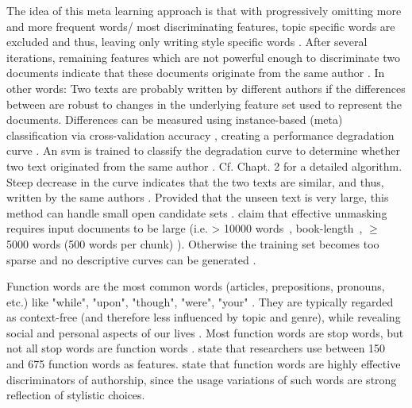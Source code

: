\begin{definition}
    [Unmasking]
    The idea of this meta learning approach is that with progressively omitting more and more frequent words/ most discriminating features, 
    topic specific words are excluded and thus, leaving only writing style specific words \cite{stein_intrinsic_2011}.
    After several iterations, remaining features which are not powerful enough to discriminate two documents indicate that 
    these documents originate from the same author \cite{stein_intrinsic_2011,tyo_state_2022,bevendorff_divergence_based_2020}.
    In other words: 
    Two texts are probably written by different authors if the differences between are robust to changes in the underlying feature set used to represent the documents.
    Differences can be measured using instance-based (meta) classification via cross-validation accuracy \cite{koppel_authorship_2011,bevendorff_generalizing_2019,bevendorff_divergence_based_2020,potthast_stylometric_2018}, 
    creating a performance degradation curve \cite{tyo_state_2022}.
    An \ac{svm} is trained to classify the degradation curve to determine whether two text originated from the same author \cite{tyo_state_2022,bevendorff_generalizing_2019}.
    Cf. \cite{bevendorff_divergence_based_2020} Chapt. 2 for a detailed algorithm.
    Steep decrease in the curve indicates that the two texts are similar, and thus, written by the same authors \cite{potthast_stylometric_2018}.
    Provided that the unseen text is very large, this method can handle small open candidate sets \cite{koppel_authorship_2011}.
    \citet{koppel_determining_2014,bevendorff_generalizing_2019} claim that effective unmasking requires input documents to be large 
    (i.e. > 10000 words~\cite{koppel_determining_2014}, book-length~\cite{bevendorff_generalizing_2019}, $\geq$ 5000 words (500 words per chunk) \cite{bevendorff_divergence_based_2020}).
    Otherwise the training set becomes too sparse and no descriptive curves can be generated \cite{bevendorff_generalizing_2019,bevendorff_divergence_based_2020}.
\end{definition}

\begin{definition}
    Function words are the most common words (articles, prepositions, pronouns, etc.) 
    like "while", "upon", "though", "were", "your" \cite{stamatatos_survey_2009,elmanarelbouanani_authorship_2014}.
    They are typically regarded as context-free (and therefore less influenced by topic and genre), 
    while revealing social and personal aspects of our lives \cite{neal_surveying_2018}.
    Most function words are stop words, but not all stop words are function words \cite{stein_intrinsic_2011}.
    \citet{elmanarelbouanani_authorship_2014} state that researchers use between 150 and 675 function words as features.
    \citet{abbasi_writeprints_2008} state that function words are highly effective discriminators of authorship, since 
    the usage variations of such words are strong reflection of stylistic choices.
\end{definition}

